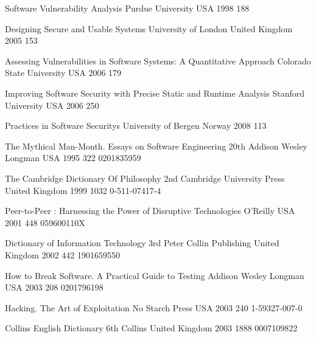 \begin{thebibliography}{9}

		{}
		{Software Vulnerability Analysis}
		{Purdue University}
		{USA}
		{1998}
		{188}
		
		{}
		{Designing Secure and Usable Systems}
		{University of London}
		{United Kingdom}
		{2005}
		{153}
	
		{}
		{Assessing Vulnerabilities in Software Systems: A Quantitative Approach}
		{Colorado State University}
		{USA}
		{2006}
		{179}
		
		{}
		{Improving Software Security with Precise Static and Runtime Analysis}
		{Stanford University}
		{USA}
		{2006}
		{250}
	
		{}
		{Practices in Software Securitys}
		{University of Bergen}
		{Norway}
		{2008}
		{113}


		{}
		{The Mythical Man-Month. Essays on Software Engineering}
		{20th}
		{Addison Wesley Longman}
		{USA}
		{1995}
		{322}
		{0201835959}
	
		{}
		{The {C}ambridge {D}ictionary Of {P}hilosophy}
		{2nd}
		{Cambridge University Press}
		{United Kingdom}
		{1999}
		{1032}
		{0-511-07417-4}
	
		{}
		{Peer-to-Peer : Harnessing the Power of Disruptive Technologies}
		{}
		{O'Reilly}
		{USA}
		{2001}
		{448}
		{059600110X}
		
		{} %
		{Dictionary of {I}nformation {T}echnology}
		{3rd}
		{Peter Collin Publishing}
		{United Kingdom}
		{2002}
		{442}
		{1901659550}
		
		{}
		{How to Break Software. A Practical Guide to Testing}
		{}
		{Addison Wesley Longman}
		{USA}
		{2003}
		{208}
		{0201796198}
	
		{}
		{Hacking. The Art of Exploitation}
		{}
		{No Starch Press}
		{USA}
		{2003}
		{240}
		{1-59327-007-0}
	
		{}
		{Collins {E}nglish {D}ictionary}
		{6th}
		{Collins}
		{United Kingdom}
		{2003}
		{1888}
		{0007109822}
	

\end{thebibliography}

